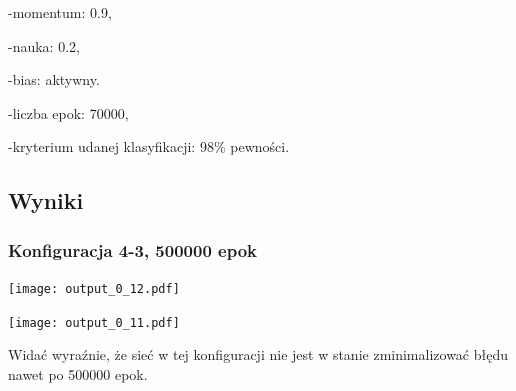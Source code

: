 \documentclass{classrep}
\begin{document}
-momentum: 0.9,

-nauka: 0.2,

-bias: aktywny.

-liczba epok: 70000,

-kryterium udanej klasyfikacji: 98\% pewności.

\subsection{Wyniki}
\subsubsection{Konfiguracja 4-3, 500000 epok}
\begin{center}
  \texttt{[image: output\_0\_12.pdf]}
\end{center}

\begin{center}
  \texttt{[image: output\_0\_11.pdf]}
\end{center}

Widać wyraźnie, że sieć w tej konfiguracji nie jest w stanie zminimalizować błędu nawet po 500000 epok.
\end{document}
